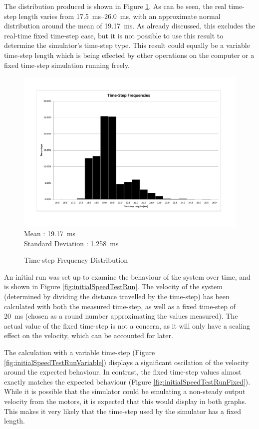 \documentclass[10pt]{article}
\begin{document}
The distribution produced is shown in Figure \ref{fig:timestepDistribution}.  As
can be seen, the real time-step length varies from
\SIrange{17.5}{26.0}{\milli\second}, with an approximate normal distribution
around the mean of \SI{19.17}{\milli\second}.  As already discussed, this
excludes the real-time fixed time-step case, but it is not possible to use this
result to determine the simulator's time-step type. This result could equally be
a variable time-step length which is being effected by other operations on the
computer or a fixed time-step simulation running freely.

\begin{figure}
 \includegraphics[width=\textwidth]{Images/time-step-length-distribution} \\
 Mean : \SI{19.17}{\milli\second} \\
 Standard Deviation : \SI{1.258}{\milli\second}

 \caption{Time-step Frequency Distribution}
 \label{fig:timestepDistribution}
\end{figure}

An initial run was set up to examine the behaviour of the system over time, and
is shown in Figure \ref{fig:initialSpeedTestRun}.  The velocity of the system
(determined by dividing the distance travelled by the time-step) has been
calculated with both the measured time-step, as well as a fixed time-step of
\SI{20}{\milli\second} (chosen as a round number approximating the values
measured). The actual value of the fixed time-step is not a concern, as it will
only have a scaling effect on the velocity, which can be accounted for later.

The calculation with a variable time-step (Figure
\ref{fig:initialSpeedTestRunVariable}) displays a significant oscilation of the
velocity around the expected behaviour.  In contrast, the fixed time-step values
almost exactly matches the expected behaviour (Figure
\ref{fig:initialSpeedTestRunFixed}).  While it is possible that the simulator
could be emulating a non-steady output velocity from the motors, it is expected
that this would display in both graphs.  This makes it very likely that the
time-step used by the simulator has a fixed length.
\end{document}
